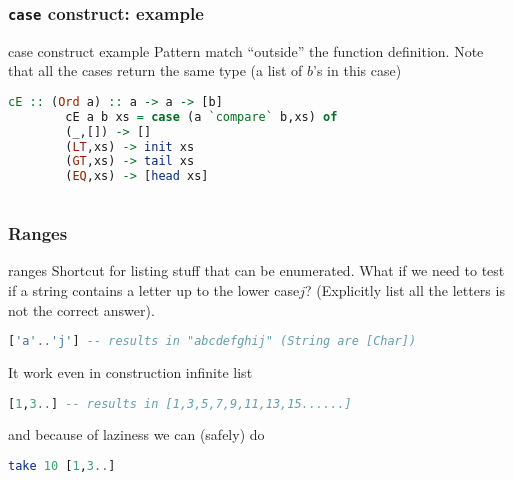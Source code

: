 	\begin{frame}[fragile]\frametitle{\texttt{case} construct: example}
		\begin{exampleblock}{case construct example}
		Pattern match ``outside'' the function definition. Note that all the cases
		return the same type (a list of $b$'s in this case)
		\begin{lstlisting}[language=Haskell,basicstyle=\footnotesize\ttfamily] 
		cE :: (Ord a) :: a -> a -> [b]
		cE a b xs = case (a `compare` b,xs) of
        (_,[]) -> []
        (LT,xs) -> init xs
        (GT,xs) -> tail xs
        (EQ,xs) -> [head xs]
				
			\end{lstlisting}
		\end{exampleblock}
	\end{frame}
	
	\begin{frame}[fragile]\frametitle{Ranges}
		\begin{exampleblock}{ranges}
		Shortcut for  listing stuff that can be enumerated. What if we need to test if
		a string contains a letter up to the lower case$j$? (Explicitly list all the
		letters is not the correct answer).
		\begin{lstlisting}[language=Haskell,basicstyle=\footnotesize\ttfamily] 
			['a'..'j'] -- results in "abcdefghij" (String are [Char])			
		\end{lstlisting}
		It work even in construction infinite list
		\begin{lstlisting}[language=Haskell,basicstyle=\footnotesize\ttfamily] 
			[1,3..] -- results in [1,3,5,7,9,11,13,15......]			
		\end{lstlisting}
		and because of laziness we can (safely) do
		\begin{lstlisting}[language=Haskell,basicstyle=\footnotesize\ttfamily] 
			take 10 [1,3..] 		
		\end{lstlisting}
		\end{exampleblock}
		
	\end{frame}
	
